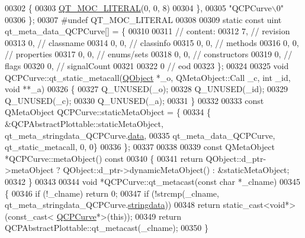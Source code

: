 \begin{DoxyCode}
00302     \{
00303 \hyperlink{a00067_a75bb9482d242cde0a06c9dbdc6b83abe}{QT\_MOC\_LITERAL}(0, 0, 8)
00304     \},
00305     \textcolor{stringliteral}{"QCPCurve\(\backslash\)0"}
00306 \};
00307 \textcolor{preprocessor}{#undef QT\_MOC\_LITERAL}
00308 
00309 \textcolor{keyword}{static} \textcolor{keyword}{const} uint qt\_meta\_data\_QCPCurve[] = \{
00310 
00311  \textcolor{comment}{// content:}
00312        7,       \textcolor{comment}{// revision}
00313        0,       \textcolor{comment}{// classname}
00314        0,    0, \textcolor{comment}{// classinfo}
00315        0,    0, \textcolor{comment}{// methods}
00316        0,    0, \textcolor{comment}{// properties}
00317        0,    0, \textcolor{comment}{// enums/sets}
00318        0,    0, \textcolor{comment}{// constructors}
00319        0,       \textcolor{comment}{// flags}
00320        0,       \textcolor{comment}{// signalCount}
00321 
00322        0        \textcolor{comment}{// eod}
00323 \};
00324 
00325 \textcolor{keywordtype}{void} QCPCurve::qt\_static\_metacall(\hyperlink{a00059}{QObject} *\_o, QMetaObject::Call \_c, \textcolor{keywordtype}{int} \_id, \textcolor{keywordtype}{void} **\_a)
00326 \{
00327     Q\_UNUSED(\_o);
00328     Q\_UNUSED(\_id);
00329     Q\_UNUSED(\_c);
00330     Q\_UNUSED(\_a);
00331 \}
00332 
00333 \textcolor{keyword}{const} QMetaObject QCPCurve::staticMetaObject = \{
00334     \{ &QCPAbstractPlottable::staticMetaObject, qt\_meta\_stringdata\_QCPCurve.\hyperlink{a00067_ac2243b1095d588f9864242ffc67f432f}{data},
00335       qt\_meta\_data\_QCPCurve,  qt\_static\_metacall, 0, 0\}
00336 \};
00337 
00338 
00339 \textcolor{keyword}{const} QMetaObject *QCPCurve::metaObject()\textcolor{keyword}{ const}
00340 \textcolor{keyword}{}\{
00341     \textcolor{keywordflow}{return} QObject::d\_ptr->metaObject ? QObject::d\_ptr->dynamicMetaObject() : &staticMetaObject;
00342 \}
00343 
00344 \textcolor{keywordtype}{void} *QCPCurve::qt\_metacast(\textcolor{keyword}{const} \textcolor{keywordtype}{char} *\_clname)
00345 \{
00346     \textcolor{keywordflow}{if} (!\_clname) \textcolor{keywordflow}{return} 0;
00347     \textcolor{keywordflow}{if} (!strcmp(\_clname, qt\_meta\_stringdata\_QCPCurve.\hyperlink{a00067_ad141d5092cc25ae43c6c60a782ca04ee}{stringdata}))
00348         \textcolor{keywordflow}{return} \textcolor{keyword}{static\_cast<}\textcolor{keywordtype}{void}*\textcolor{keyword}{>}(\textcolor{keyword}{const\_cast<} \hyperlink{a00028}{QCPCurve}*\textcolor{keyword}{>}(\textcolor{keyword}{this}));
00349     \textcolor{keywordflow}{return} QCPAbstractPlottable::qt\_metacast(\_clname);
00350 \}

\end{DoxyCode}
